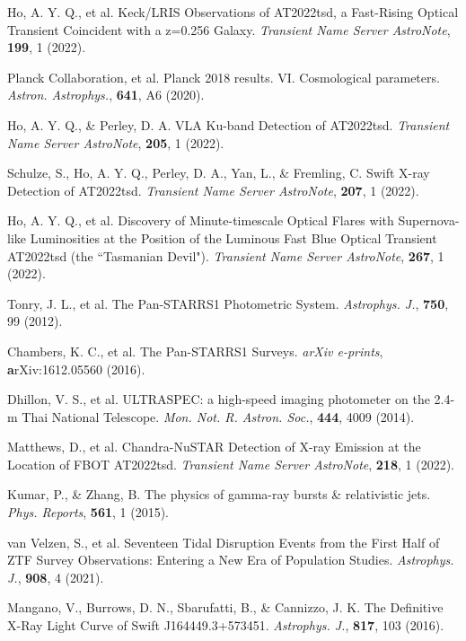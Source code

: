 \documentclass{nature_plusfigure}
\newcommand{\mn}{{Mon. Not. R. Astron. Soc.}}
\newcommand{\physrep}{{Phys. Reports}}
\newcommand{\mnras}{\mn}
\newcommand{\apj}{{Astrophys. J.}}
\newcommand{\aap}{{Astron. Astrophys.}}
\begin{document}
\begin{thebibliography}{100}
 Ho, A. Y. Q., et al. Keck/LRIS Observations of AT2022tsd, a Fast-Rising Optical Transient Coincident with a z=0.256 Galaxy. \emph{Transient Name Server AstroNote}, \textbf{199}, 1 (2022). 

 Planck Collaboration, et al. Planck 2018 results. VI. Cosmological parameters. \emph{\aap}, \textbf{641}, A6 (2020). 

 Ho, A. Y. Q., \& Perley, D. A. VLA Ku-band Detection of AT2022tsd. \emph{Transient Name Server AstroNote}, \textbf{205}, 1 (2022). 

 Schulze, S., Ho, A. Y. Q., Perley, D. A., Yan, L., \& Fremling, C. Swift X-ray Detection of AT2022tsd. \emph{Transient Name Server AstroNote}, \textbf{207}, 1 (2022). 

 Ho, A. Y. Q., et al. Discovery of Minute-timescale Optical Flares with Supernova-like Luminosities at the Position of the Luminous Fast Blue Optical Transient AT2022tsd (the ``Tasmanian Devil"). \emph{Transient Name Server AstroNote}, \textbf{267}, 1 (2022). 

 Tonry, J. L., et al. The Pan-STARRS1 Photometric System. \emph{\apj}, \textbf{750}, 99 (2012). 

 Chambers, K. C., et al. The Pan-STARRS1 Surveys. \emph{arXiv e-prints}, \textbf arXiv:1612.05560 (2016). 

 Dhillon, V. S., et al. ULTRASPEC: a high-speed imaging photometer on the 2.4-m Thai National Telescope. \emph{\mnras}, \textbf{444}, 4009 (2014). 

 Matthews, D., et al. Chandra-NuSTAR Detection of X-ray Emission at the Location of FBOT AT2022tsd. \emph{Transient Name Server AstroNote}, \textbf{218}, 1 (2022). 


 Kumar, P., \& Zhang, B. The physics of gamma-ray bursts \& relativistic jets. \emph{\physrep}, \textbf{561}, 1 (2015). 

 van Velzen, S., et al. Seventeen Tidal Disruption Events from the First Half of ZTF Survey Observations: Entering a New Era of Population Studies. \emph{\apj}, \textbf{908}, 4 (2021). 

 Mangano, V., Burrows, D. N., Sbarufatti, B., \& Cannizzo, J. K. The Definitive X-Ray Light Curve of Swift J164449.3+573451. \emph{\apj}, \textbf{817}, 103 (2016). 


\end{thebibliography}
\end{document}
